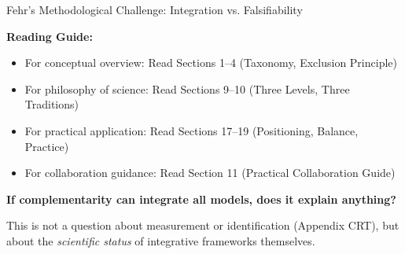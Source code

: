 \begin{chapter}{Fehr's Methodological Challenge: Integration vs. Falsifiability}
\begin{tcolorbox}[colback=purple!5!white, colframe=purple!75!black,
    title=Chapter Linkage]
\textbf{Reading Guide:}
\begin{itemize}[nosep]
\item For conceptual overview: Read Sections 1--4 (Taxonomy, Exclusion Principle)
\item For philosophy of science: Read Sections 9--10 (Three Levels, Three Traditions)
\item For practical application: Read Sections 17--19 (Positioning, Balance, Practice)
\item For collaboration guidance: Read Section 11 (Practical Collaboration Guide)
\end{itemize}

\end{tcolorbox}

\begin{abstract}
This appendix formalizes a meta-level critique of complementarity frameworks that is implicit in Ernst Fehr's methodological position but rarely stated explicitly: \textbf{the tension between model integration and scientific falsifiability}. Unlike the ten canonical arguments (Appendix CRT), which concern measurement, identification, or complexity, Fehr's deeper concern is epistemological: if a framework can integrate all models, it loses the disciplinary power that makes models scientific. This appendix (1) reconstructs Fehr's position from his methodological commitments, (2) shows how complementarity ($\gamma$) can either confirm or refute this concern depending on its use, and (3) proposes a resolution: $\gamma$ as an \textit{exclusion principle}, not an integration principle. The central claim: complementarity is scientifically legitimate precisely when it tells us what is \textit{not} complementary.
\end{abstract}

\begin{tcolorbox}[colback=red!5!white,colframe=red!75!black,title=\textbf{The Fundamental Question}]
\begin{center}
\large
\textbf{If complementarity can integrate all models, does it explain anything?}
\end{center}

\vspace{0.5em}
This is not a question about measurement or identification (Appendix CRT), but about the \textit{scientific status} of integrative frameworks themselves.
\end{tcolorbox}


\end{chapter}
